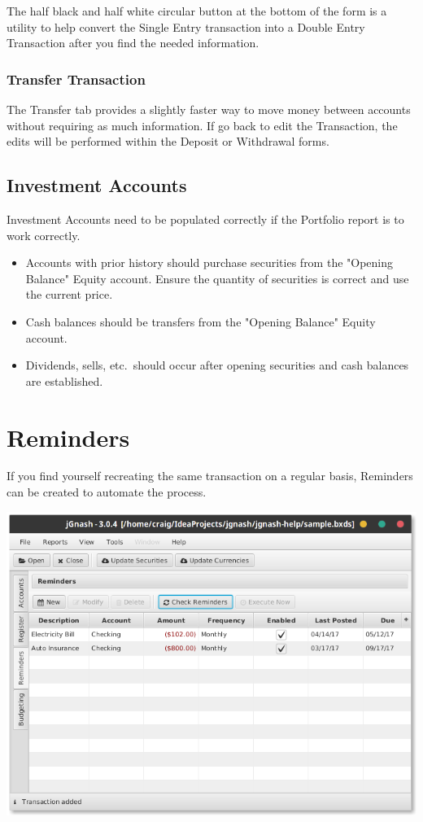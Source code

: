\documentclass[letterpaper,12pt]{book}
\begin{document}
    The half black and half white circular button at the bottom of the form is a utility to help convert the
    Single Entry transaction into a Double Entry Transaction after you find the needed information.

    \subsection{Transfer Transaction}
    The Transfer tab provides a slightly faster way to move money between accounts without requiring as much information.
    If go back to edit the Transaction, the edits will be performed within the Deposit or Withdrawal forms.

    \section{Investment Accounts}
    Investment Accounts need to be populated correctly if the Portfolio report is to work correctly.

    \begin{itemize}
        \item Accounts with prior history should purchase securities from the "Opening Balance" Equity account. Ensure the quantity of
        securities is correct and use the current price.
        \item Cash balances should be transfers from the "Opening Balance" Equity account.
        \item Dividends, sells, etc.\ should occur after opening securities and cash balances are established.
    \end{itemize}

    \chapter{Reminders}
    If you find yourself recreating the same transaction on a regular basis, Reminders can be created to automate the process.

    \includegraphics[width=0.8\linewidth]{images/reminders}
\end{document}
